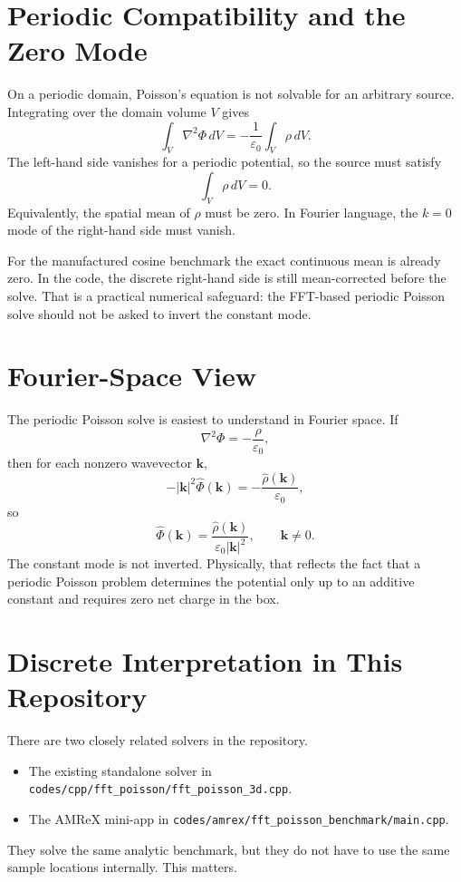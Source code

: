 \documentclass[11pt]{article}
\begin{document}
\section{Periodic Compatibility and the Zero Mode}
On a periodic domain, Poisson's equation is not solvable for an arbitrary source. Integrating over the domain volume $V$ gives
\[
\int_V \nabla^2 \Phi\, dV
=
-\frac{1}{\varepsilon_0}\int_V \rho\, dV.
\]
The left-hand side vanishes for a periodic potential, so the source must satisfy
\[
\int_V \rho\, dV = 0.
\]
Equivalently, the spatial mean of $\rho$ must be zero. In Fourier language, the $k=0$ mode of the right-hand side must vanish.

For the manufactured cosine benchmark the exact continuous mean is already zero. In the code, the discrete right-hand side is still mean-corrected before the solve. That is a practical numerical safeguard: the FFT-based periodic Poisson solve should not be asked to invert the constant mode.

\section{Fourier-Space View}
The periodic Poisson solve is easiest to understand in Fourier space. If
\[
\nabla^2 \Phi = -\frac{\rho}{\varepsilon_0},
\]
then for each nonzero wavevector $\mathbf k$,
\[
-|\mathbf k|^2 \hat{\Phi}(\mathbf k)
=
-\frac{\hat{\rho}(\mathbf k)}{\varepsilon_0},
\]
so
\[
\hat{\Phi}(\mathbf k)
=
\frac{\hat{\rho}(\mathbf k)}{\varepsilon_0 |\mathbf k|^2},
\qquad
\mathbf k \neq 0.
\]
The constant mode is not inverted. Physically, that reflects the fact that a periodic Poisson problem determines the potential only up to an additive constant and requires zero net charge in the box.

\section{Discrete Interpretation in This Repository}
There are two closely related solvers in the repository.
\begin{itemize}
\item The existing standalone solver in \texttt{codes/cpp/fft\_poisson/fft\_poisson\_3d.cpp}.
\item The AMReX mini-app in \texttt{codes/amrex/fft\_poisson\_benchmark/main.cpp}.
\end{itemize}

They solve the same analytic benchmark, but they do not have to use the same sample locations internally. This matters.
\end{document}
